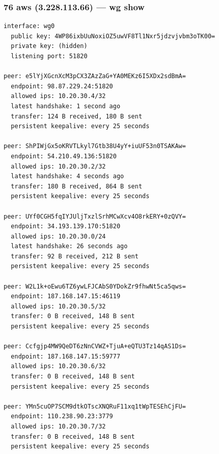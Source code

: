 \documentclass[11pt,a4paper]{article}
\begin{document}
\subsubsection*{76 aws (3.228.113.66) — wg show}
\begin{lstlisting}
interface: wg0
  public key: 4WP86ixbUuNoxiOZ5uwVF8Tl1Nxr5jdzvjvbm3oTK00=
  private key: (hidden)
  listening port: 51820

peer: e5lYjXGcnXcM3pCX3ZAzZaG+YA0MEKz6I5XDx2sdBmA=
  endpoint: 98.87.229.24:51820
  allowed ips: 10.20.30.4/32
  latest handshake: 1 second ago
  transfer: 124 B received, 180 B sent
  persistent keepalive: every 25 seconds

peer: ShPIWjGx5oKRVTLkyl7Gtb38U4yY+iuUF53n0TSAKAw=
  endpoint: 54.210.49.136:51820
  allowed ips: 10.20.30.2/32
  latest handshake: 4 seconds ago
  transfer: 180 B received, 864 B sent
  persistent keepalive: every 25 seconds

peer: UYf0CGH5fqIYJUljTxzlSrhMCwXcv4O8rkERY+0zQVY=
  endpoint: 34.193.139.170:51820
  allowed ips: 10.20.30.0/24
  latest handshake: 26 seconds ago
  transfer: 92 B received, 212 B sent
  persistent keepalive: every 25 seconds

peer: W2L1k+oEwu6TZ6ywLFJCAbS0YDokZr9fhwNt5ca5qws=
  endpoint: 187.168.147.15:46119
  allowed ips: 10.20.30.5/32
  transfer: 0 B received, 148 B sent
  persistent keepalive: every 25 seconds

peer: Ccfgjp4MW9QeDT6zNnCVWZ+TjuA+eQTU3Tz14qAS1Ds=
  endpoint: 187.168.147.15:59777
  allowed ips: 10.20.30.6/32
  transfer: 0 B received, 148 B sent
  persistent keepalive: every 25 seconds

peer: YMn5cuOP7SCM9dtkOTscXNQRuF11xq1tWpTESEhCjFU=
  endpoint: 110.238.90.23:3779
  allowed ips: 10.20.30.7/32
  transfer: 0 B received, 148 B sent
  persistent keepalive: every 25 seconds

\end{lstlisting}
\end{document}
